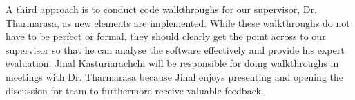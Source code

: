 \documentclass[12pt, titlepage]{article}
\begin{document}
\begin{enumerate}
  A third approach is to conduct code walkthroughs for our supervisor, Dr. Tharmarasa, as new elements are implemented. While these walkthroughs do not have to be perfect or formal, they should clearly get the point across to our supervisor so that he can analyse the software effectively and provide his expert evaluation. Jinal Kasturiarachchi will be responsible for doing walkthroughs in meetings with Dr. Tharmarasa because Jinal enjoys presenting and opening the discussion for team to furthermore receive valuable feedback.  \\
\end{enumerate}
\end{document}

